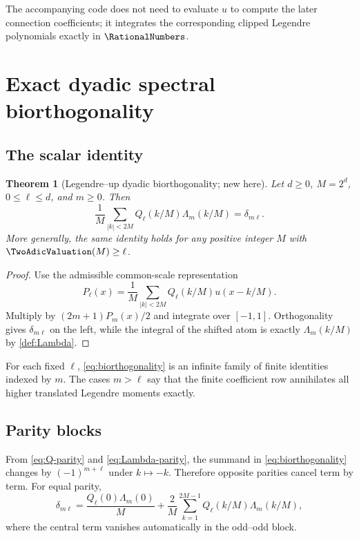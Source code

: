 \documentclass[11pt,oneside]{article}
\numberwithin{equation}{section}
\newtheorem{theorem}{Theorem}[section]
\theoremstyle{definition}
\theoremstyle{remark}
\begin{document}
The accompanying code does not need to evaluate $u$ to compute the later
connection coefficients; it integrates the corresponding clipped Legendre
polynomials exactly in $\RationalNumbers$.

\section{Exact dyadic spectral biorthogonality}
\label{sec:biorthogonality}

\subsection{The scalar identity}

\begin{theorem}[Legendre--up dyadic biorthogonality; new here]
\label{thm:biorthogonality}
Let $d\ge0$, $M=2^d$, $0\le\ell\le d$, and $m\ge0$.  Then
\begin{equation}
 \boxed{
 \frac1M\sum_{|k|<2M}Q_\ell(k/M)\Lambda_m(k/M)
 =\delta_{m\ell}.}
 \label{eq:biorthogonality}
\end{equation}
More generally, the same identity holds for any positive integer $M$ with
$\TwoAdicValuation(M)\ge\ell$.
\end{theorem}

\begin{proof}
Use the admissible common-scale representation
\[
 P_\ell(x)=\frac1M\sum_{|k|<2M}Q_\ell(k/M)u(x-k/M).
\]
Multiply by $(2m+1)P_m(x)/2$ and integrate over $[-1,1]$.  Orthogonality gives
$\delta_{m\ell}$ on the left, while the integral of the shifted atom is exactly
$\Lambda_m(k/M)$ by \cref{def:Lambda}.
\end{proof}

For each fixed $\ell$, \eqref{eq:biorthogonality} is an infinite family of
finite identities indexed by $m$.  The cases $m>\ell$ say that the finite
coefficient row annihilates all higher translated Legendre moments exactly.

\subsection{Parity blocks}

From \eqref{eq:Q-parity} and \eqref{eq:Lambda-parity}, the summand in
\eqref{eq:biorthogonality} changes by $(-1)^{m+\ell}$ under $k\mapsto-k$.
Therefore opposite parities cancel term by term.  For equal parity,
\begin{equation}
 \delta_{m\ell}
 =\frac{Q_\ell(0)\Lambda_m(0)}M
 +\frac2M\sum_{k=1}^{2M-1}
 Q_\ell(k/M)\Lambda_m(k/M),
 \label{eq:biorthogonality-paired}
\end{equation}
where the central term vanishes automatically in the odd--odd block.
\end{document}
